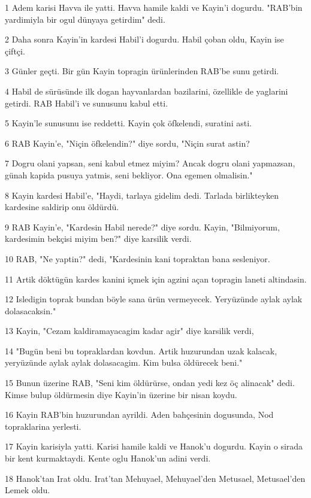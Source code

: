 \par 1 Adem karisi Havva ile yatti. Havva hamile kaldi ve Kayin'i dogurdu. "RAB'bin yardimiyla bir ogul dünyaya getirdim" dedi.
\par 2 Daha sonra Kayin'in kardesi Habil'i dogurdu. Habil çoban oldu, Kayin ise çiftçi.
\par 3 Günler geçti. Bir gün Kayin topragin ürünlerinden RAB'be sunu getirdi.
\par 4 Habil de sürüsünde ilk dogan hayvanlardan bazilarini, özellikle de yaglarini getirdi. RAB Habil'i ve sunusunu kabul etti.
\par 5 Kayin'le sunusunu ise reddetti. Kayin çok öfkelendi, suratini asti.
\par 6 RAB Kayin'e, "Niçin öfkelendin?" diye sordu, "Niçin surat astin?
\par 7 Dogru olani yapsan, seni kabul etmez miyim? Ancak dogru olani yapmazsan, günah kapida pusuya yatmis, seni bekliyor. Ona egemen olmalisin."
\par 8 Kayin kardesi Habil'e, "Haydi, tarlaya gidelim dedi. Tarlada birlikteyken kardesine saldirip onu öldürdü.
\par 9 RAB Kayin'e, "Kardesin Habil nerede?" diye sordu. Kayin, "Bilmiyorum, kardesimin bekçisi miyim ben?" diye karsilik verdi.
\par 10 RAB, "Ne yaptin?" dedi, "Kardesinin kani topraktan bana sesleniyor.
\par 11 Artik döktügün kardes kanini içmek için agzini açan topragin laneti altindasin.
\par 12 Isledigin toprak bundan böyle sana ürün vermeyecek. Yeryüzünde aylak aylak dolasacaksin."
\par 13 Kayin, "Cezam kaldiramayacagim kadar agir" diye karsilik verdi,
\par 14 "Bugün beni bu topraklardan kovdun. Artik huzurundan uzak kalacak, yeryüzünde aylak aylak dolasacagim. Kim bulsa öldürecek beni."
\par 15 Bunun üzerine RAB, "Seni kim öldürürse, ondan yedi kez öç alinacak" dedi. Kimse bulup öldürmesin diye Kayin'in üzerine bir nisan koydu.
\par 16 Kayin RAB'bin huzurundan ayrildi. Aden bahçesinin dogusunda, Nod topraklarina yerlesti.
\par 17 Kayin karisiyla yatti. Karisi hamile kaldi ve Hanok'u dogurdu. Kayin o sirada bir kent kurmaktaydi. Kente oglu Hanok'un adini verdi.
\par 18 Hanok'tan Irat oldu. Irat'tan Mehuyael, Mehuyael'den Metusael, Metusael'den Lemek oldu.
